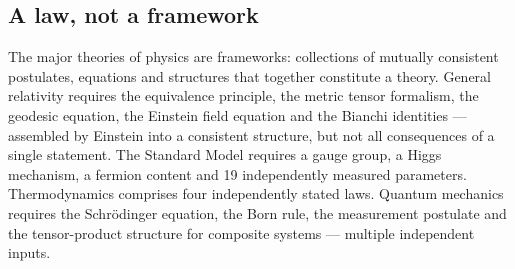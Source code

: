 \subsection{A law, not a framework}
The major theories of physics are frameworks: collections of mutually consistent postulates, equations and structures that together constitute a theory.
General relativity requires the equivalence principle, the metric tensor formalism, the geodesic equation, the Einstein field equation and the Bianchi
identities --- assembled by Einstein into a consistent structure, but not all consequences of a single statement. The Standard Model requires a gauge
group, a Higgs mechanism, a fermion content and 19 independently measured parameters. Thermodynamics comprises four independently stated laws. Quantum
mechanics requires the Schr\"odinger equation, the Born rule, the measurement postulate and the tensor-product structure for composite systems --- multiple
independent inputs.

